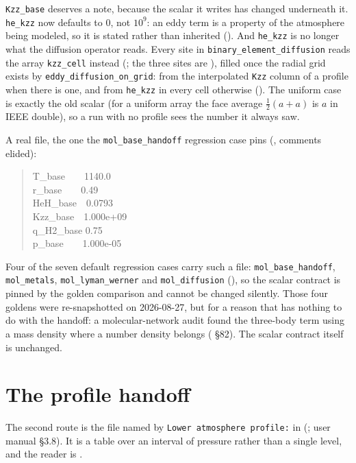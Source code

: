\documentclass[english,a4paper]{my_memo}
\begin{document}
\verb|Kzz_base| deserves a note, because the scalar it writes has changed
underneath it. \verb|he_kzz| now defaults to $0$, not $10^{9}$: an eddy term
is a property of the atmosphere being modeled, so it is stated rather than
inherited (). And
\verb|he_kzz| is no longer what the diffusion operator reads. Every site in
\verb|binary_element_diffusion| reads the array \verb|kzz_cell| instead
(; the three sites are
), filled once the radial
grid exists by \verb|eddy_diffusion_on_grid|: from the interpolated
\verb|Kzz| column of a profile when there is one, and from \verb|he_kzz| in
every cell otherwise
(). The
uniform case is exactly the old scalar (for a uniform array the face
average $\tfrac12(a+a)$ is $a$ in IEEE double), so a run with no profile
sees the number it always saw.

A real file, the one the \verb|mol_base_handoff| regression case pins
(, comments elided):

\begin{quote}\ttfamily
T\_base\ \ \ \ 1140.0\\
r\_base\ \ \ \ 0.49\\
HeH\_base\ \ 0.0793\\
Kzz\_base\ \ 1.000e+09\\
q\_H2\_base 0.75\\
p\_base\ \ \ \ 1.000e-05
\end{quote}

Four of the seven default regression cases carry such a file:
\verb|mol_base_handoff|, \verb|mol_metals|, \verb|mol_lyman_werner| and
\verb|mol_diffusion| (), so the
scalar contract is pinned by the golden comparison and cannot be changed
silently. Those four goldens were re-snapshotted on 2026-08-27, but for a
reason that has nothing to do with the handoff: a molecular-network audit
found the three-body term using a mass density where a number density
belongs ( \S82). The scalar contract itself is unchanged.

\section{The profile handoff}
\label{sec:profile}

The second route is the file named by \verb|Lower atmosphere profile:| in
 (; user manual \S3.8). It is a
table over an interval of pressure rather than a single level, and the
reader is .
\end{document}
